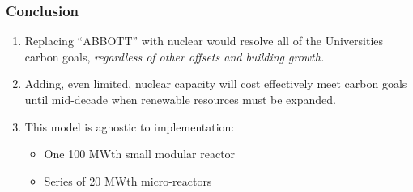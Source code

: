 \begin{frame}
  \frametitle{Conclusion}
  \begin{enumerate}
    \item Replacing ``ABBOTT'' with nuclear would resolve all of the Universities
    carbon goals, \textit{regardless of other offsets and building growth.}
    \item Adding, even limited, nuclear capacity will cost effectively meet carbon goals until mid-decade when renewable resources must be expanded.
    \item This model is agnostic to implementation:
    \begin{itemize}
      \item One 100 MWth small modular reactor
      \item Series of 20 MWth micro-reactors
    \end{itemize}
  \end{enumerate}
\end{frame}
